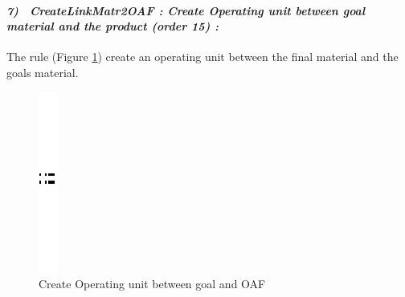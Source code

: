 \paragraph{\emph{7)~ CreateLinkMatr2OAF : Create Operating unit between goal material and the product (order 15) :} }
 
 
The rule (Figure \ref{fig:Create Operating unit between  goal and OAF}) 
create an operating unit  between the final material and the goals material.
  
\vspace{1cm}
\begin{figure}[th]
\centering 
	\quad{}
		\includegraphics{ch3/img/sep}
	\quad{}
\caption{\label{fig:Create Operating unit between  goal and OAF}Create Operating unit between  goal and OAF}
 
\end{figure}
\vspace{1cm}


